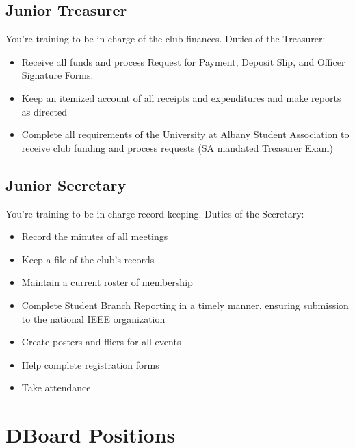 \documentclass{article}
\begin{document}
\subsection{Junior Treasurer}
You're training to be in charge of the club finances.
\newline
\newline
Duties of the Treasurer:
\begin{itemize}
    \item Receive all funds and process Request for Payment, Deposit Slip, and Officer Signature Forms.   
    \item Keep an itemized account of all receipts and expenditures and make reports as directed  
    \item Complete all requirements of the University at Albany Student Association to receive club funding and process requests (SA mandated Treasurer Exam)
\end{itemize}

\subsection{Junior Secretary}
You're training to be in charge record keeping.
\newline
\newline
Duties of the Secretary:
\begin{itemize}
    \item Record the minutes of all meetings  
    \item Keep a file of the club’s records
    \item Maintain a current roster of membership  
    \item Complete Student Branch Reporting in a timely manner, ensuring submission to the national IEEE organization 
    \item Create posters and fliers for all events 
    \item Help complete registration forms 
    \item Take attendance
\end{itemize}
\newpage


\section{DBoard Positions} \label{dbp}
\end{document}
